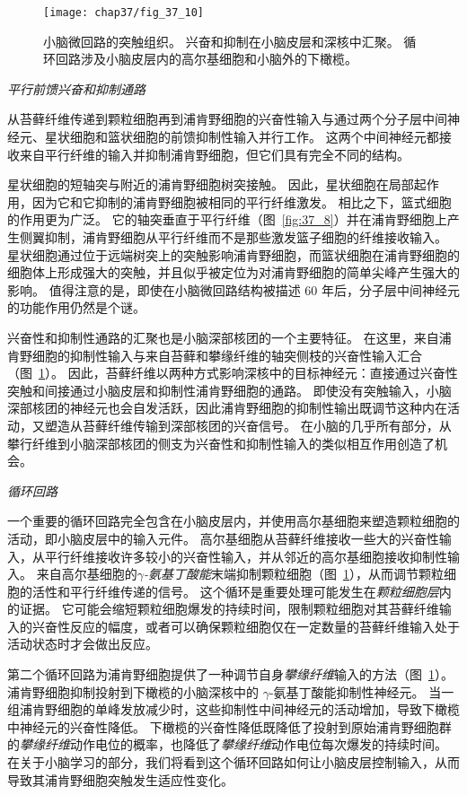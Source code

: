 \begin{figure}[htbp]
	\centering
	\texttt{[image: chap37/fig\_37\_10]}
	\caption{小脑微回路的突触组织。
		兴奋和抑制在小脑皮层和深核中汇聚。
		循环回路涉及小脑皮层内的高尔基细胞和小脑外的下橄榄\cite{raymond1996cerebellum}。}
	\label{fig:37_10}
\end{figure}


\textit{平行前馈兴奋和抑制通路}


从苔藓纤维传递到颗粒细胞再到浦肯野细胞的兴奋性输入与通过两个分子层中间神经元、星状细胞和篮状细胞的前馈抑制性输入并行工作。
这两个中间神经元都接收来自平行纤维的输入并抑制浦肯野细胞，但它们具有完全不同的结构。


星状细胞的短轴突与附近的浦肯野细胞树突接触。
因此，星状细胞在局部起作用，因为它和它抑制的浦肯野细胞被相同的平行纤维激发。
相比之下，篮式细胞的作用更为广泛。 它的轴突垂直于平行纤维（图~\ref{fig:37_8}）并在浦肯野细胞上产生侧翼抑制，浦肯野细胞从平行纤维而不是那些激发篮子细胞的纤维接收输入。
星状细胞通过位于远端树突上的突触影响浦肯野细胞，而篮状细胞在浦肯野细胞的细胞体上形成强大的突触，并且似乎被定位为对浦肯野细胞的简单尖峰产生强大的影响。
值得注意的是，即使在小脑微回路结构被描述 60 年后，分子层中间神经元的功能作用仍然是个谜。


兴奋性和抑制性通路的汇聚也是小脑深部核团的一个主要特征。
在这里，来自浦肯野细胞的抑制性输入与来自苔藓和攀缘纤维的轴突侧枝的兴奋性输入汇合（图~\ref{fig:37_10}）。
因此，苔藓纤维以两种方式影响深核中的目标神经元：直接通过兴奋性突触和间接通过小脑皮层和抑制性浦肯野细胞的通路。
即使没有突触输入，小脑深部核团的神经元也会自发活跃，因此浦肯野细胞的抑制性输出既调节这种内在活动，又塑造从苔藓纤维传输到深部核团的兴奋信号。
在小脑的几乎所有部分，从攀行纤维到小脑深部核团的侧支为兴奋性和抑制性输入的类似相互作用创造了机会。



\textit{循环回路}

一个重要的循环回路完全包含在小脑皮层内，并使用高尔基细胞来塑造颗粒细胞的活动，即小脑皮层中的输入元件。
高尔基细胞从苔藓纤维接收一些大的兴奋性输入，从平行纤维接收许多较小的兴奋性输入，并从邻近的高尔基细胞接收抑制性输入。
来自高尔基细胞的\textit{$\gamma$-氨基丁酸能}末端抑制颗粒细胞（图~\ref{fig:37_10}），从而调节颗粒细胞的活性和平行纤维传递的信号。
这个循环是重要处理可能发生在\textit{颗粒细胞层}内的证据。
它可能会缩短颗粒细胞爆发的持续时间，限制颗粒细胞对其苔藓纤维输入的兴奋性反应的幅度，或者可以确保颗粒细胞仅在一定数量的苔藓纤维输入处于活动状态时才会做出反应。


第二个循环回路为浦肯野细胞提供了一种调节自身\textit{攀缘纤维}输入的方法（图~\ref{fig:37_10}）。
浦肯野细胞抑制投射到下橄榄的小脑深核中的 $\gamma$-氨基丁酸能抑制性神经元。
当一组浦肯野细胞的单峰发放减少时，这些抑制性中间神经元的活动增加，导致下橄榄中神经元的兴奋性降低。
下橄榄的兴奋性降低既降低了投射到原始浦肯野细胞群的\textit{攀缘纤维}动作电位的概率，也降低了\textit{攀缘纤维}动作电位每次爆发的持续时间。
在关于小脑学习的部分，我们将看到这个循环回路如何让小脑皮层控制输入，从而导致其浦肯野细胞突触发生适应性变化。




